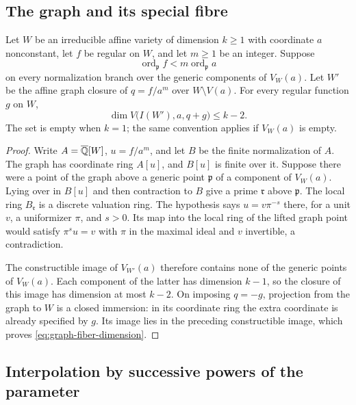 \subsection{The graph and its special fibre}

\begin{lemma}\label{lem:graph-fiber}
Let $W$ be an irreducible affine variety of dimension $k\geq1$ with
coordinate $a$ nonconstant, let $f$ be regular on $W$, and let $m\ge1$
be an integer.  Suppose
\[
 \operatorname{ord}_{\mathfrak p}f
 <m\operatorname{ord}_{\mathfrak p}a
\]
on every normalization branch over the generic components of $V_W(a)$.
Let $W'$ be the affine graph closure of $q=f/a^m$ over $W\setminus V(a)$.
For every regular function $g$ on $W$,
\begin{equation}\label{eq:graph-fiber-dimension}
 \dim V\bigl(I(W'),a,q+g\bigr)\leq k-2.
\end{equation}
The set is empty when $k=1$; the same convention applies if $V_W(a)$
is empty.
\end{lemma}

\begin{proof}
Write $A=\overline{\mathbb Q}[W]$, $u=f/a^m$, and let $B$ be the finite normalization
of $A$.  The graph has coordinate ring $A[u]$, and $B[u]$ is finite
over it.  Suppose there were a point of the graph above a generic
point $\mathfrak p$ of a component of $V_W(a)$.  Lying over in
$B[u]$ and then contraction to $B$ give a prime $\mathfrak r$ above
$\mathfrak p$.  The local ring $B_{\mathfrak r}$ is a discrete
valuation ring.  The hypothesis says $u=v\pi^{-s}$ there, for a unit
$v$, a uniformizer $\pi$, and $s>0$.  Its map into the local ring of
the lifted graph point would satisfy $\pi^su=v$ with $\pi$ in the
maximal ideal and $v$ invertible, a contradiction.

The constructible image of $V_{W'}(a)$ therefore contains none of the
generic points of $V_W(a)$.  Each component of the latter has dimension
$k-1$, so the closure of this image has dimension at most $k-2$.
On imposing $q=-g$, projection from the graph to $W$ is a closed
immersion: in its coordinate ring the extra coordinate is already
specified by $g$.  Its image lies in the preceding constructible image,
which proves \eqref{eq:graph-fiber-dimension}.
\end{proof}

\subsection{Interpolation by successive powers of the parameter}

